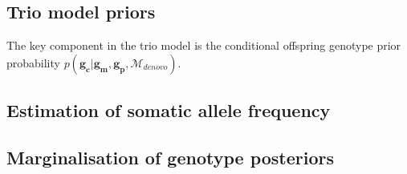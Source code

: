 \documentclass[notitlepage, twocolumn]{article}
\begin{document}
\subsection*{Trio model priors}

The key component in the trio model is the conditional offspring genotype prior probability $p(\boldsymbol{g_c} | \boldsymbol{g_m}, \boldsymbol{g_p}, \mathcal{M}_{denovo})$. 

\subsection*{Estimation of somatic allele frequency}

\subsection*{Marginalisation of genotype posteriors}
\end{document}
